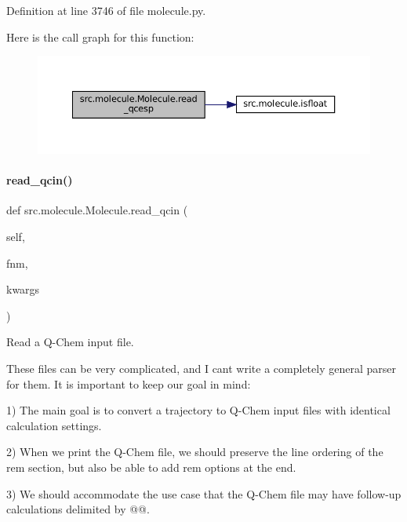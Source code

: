 Definition at line 3746 of file molecule.\+py.

Here is the call graph for this function\+:
\nopagebreak
\begin{figure}[H]
\begin{center}
\leavevmode
\includegraphics[width=350pt]{classsrc_1_1molecule_1_1Molecule_a12369eb306cb29148e610e9ee08d7e2c_cgraph}
\end{center}
\end{figure}
\mbox{\label{classsrc_1_1molecule_1_1Molecule_aa9caaf6d7ccff3a9077da98b4c8096a9}} 
\paragraph{\texorpdfstring{read\+\_\+qcin()}{read\_qcin()}}
{\footnotesize\ttfamily def src.\+molecule.\+Molecule.\+read\+\_\+qcin (\begin{DoxyParamCaption}\item[{}]{self,  }\item[{}]{fnm,  }\item[{}]{kwargs }\end{DoxyParamCaption})}



Read a Q-\/\+Chem input file. 

These files can be very complicated, and I can\textquotesingle{}t write a completely general parser for them. It is important to keep our goal in mind\+:

1) The main goal is to convert a trajectory to Q-\/\+Chem input files with identical calculation settings.

2) When we print the Q-\/\+Chem file, we should preserve the line ordering of the \textquotesingle{}rem\textquotesingle{} section, but also be able to add \textquotesingle{}rem\textquotesingle{} options at the end.

3) We should accommodate the use case that the Q-\/\+Chem file may have follow-\/up calculations delimited by \textquotesingle{}@@\textquotesingle{}.

